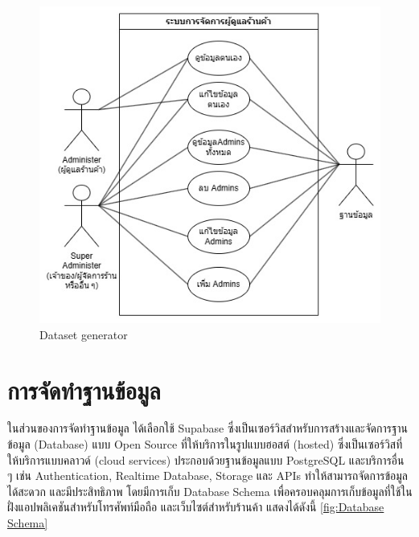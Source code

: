 \begin{figure}[h]
  \begin{center}

    \includegraphics[scale=0.5]{pic/diagram/use-case-admin.jpg}
  \end{center}

  \caption[Dataset generator]{Dataset generator}
  \label{fig:Administer System Use Case Diagram}
\end{figure}

\section{การจัดทำฐานข้อมูล}
ในส่วนของการจัดทำฐานข้อมูล ได้เลือกใช้ Supabase ซึ่งเป็นเซอร์วิสสำหรับการสร้างและจัดการฐานข้อมูล (Database) แบบ Open Source ที่ให้บริการในรูปแบบฮอสต์ (hosted) ซึ่งเป็นเซอร์วิสที่ให้บริการแบบคลาวด์ (cloud services) ประกอบด้วยฐานข้อมูลแบบ PostgreSQL และบริการอื่น ๆ เช่น Authentication, Realtime Database, Storage และ APIs ทำให้สามารถจัดการข้อมูลได้สะดวก และมีประสิทธิภาพ โดยมีการเก็บ Database Schema เพื่อครอบคลุมการเก็บข้อมูลที่ใช้ในฝั่งแอปพลิเคชันสำหรับโทรศัพท์มือถือ และเว็บไซต์สำหรับร้านค้า แสดงได้ดังนี้
\ref{fig:Database Schema}

